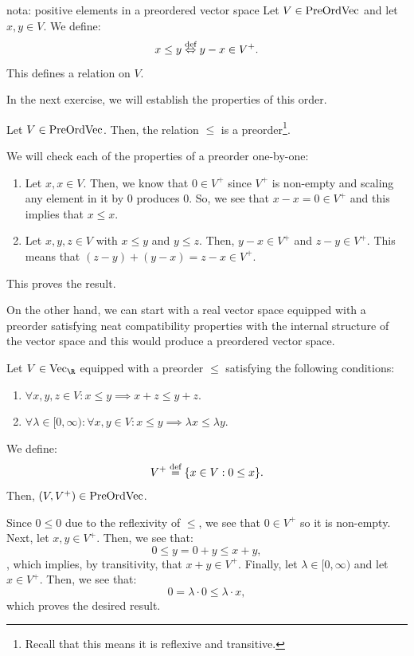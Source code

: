 \documentclass[main.tex]{subfiles}
\begin{document}
\begin{notation}{}{nota: positive elements in a preordered vector space}
Let $V \in \text{PreOrdVec}$ and let $x,y \in V$. We define:
\[x \leq y \defiff y-x \in V^+.\] 
This defines a relation on $V$.
\end{notation}

In the next exercise, we will establish the properties of this order. 

\begin{exercise}\label{ex: properties of the order on a preordered vector space}Let $V \in \text{PreOrdVec}$. Then, the relation $\leq$ is a preorder\footnote{Recall that this means it is reflexive and transitive.}.
\end{exercise}
\begin{solution}\label{sol: properties of the order on a preordered vector space}We will check each of the properties of a preorder one-by-one:
\begin{enumerate}
    \item Let $x,x \in V$. Then, we know that $0 \in V^+$ since $V^+$ is non-empty and scaling any element in it by $0$ produces $0$. So, we see that $x-x = 0 \in V^+$ and this implies that $x \leq x$. 
    \item Let $x,y,z \in V$ with $x \leq y$ and $y \leq z$. Then, $y-x \in V^+$ and $z-y \in V^+$. This means that $(z-y) + (y-x) = z-x \in V^+$.  
\end{enumerate}
This proves the result. 
\end{solution}

On the other hand, we can start with a real vector space equipped with a preorder satisfying neat compatibility properties with the internal structure of the vector space and this would produce a preordered vector space. 

\begin{exercise}\label{ex: every vector space with a compatible preorder is a preordered vector space}Let $V \in \Vect{\R}$ equipped with a preorder $\leq$ satisfying the following conditions:
\begin{enumerate}
    \item $\forall x,y,z \in V: x \leq y \implies x+z \leq y+z$.
    \item $\forall \lambda \in [0,\infty): \forall x,y \in V: x \leq y \implies \lambda x \leq \lambda y$. 
\end{enumerate}
We define:
\[V^+ \stackrel{\text{def}}{=} \{x \in V: 0 \leq x\}.\]  
Then, $(V,V^+) \in \text{PreOrdVec}$. 
\end{exercise}
\begin{solution}\label{sol: every vector space with a compatible preorder is a preordered vector space}Since $0 \leq 0$ due to the reflexivity of $\leq$, we see that $0 \in V^+$ so it is non-empty. Next, let $x,y \in V^+$. Then, we see that:
\[0 \leq y = 0+y \leq x+y,\], 
which implies, by transitivity, that $x+y \in V^+$. Finally, let $\lambda \in [0,\infty)$ and let $x \in V^+$. Then, we see that:
\[0 = \lambda \cdot 0 \leq \lambda \cdot x,\] 
which proves the desired result. 
\end{solution}
\end{document}
